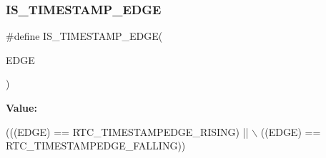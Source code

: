 \subsubsection{\texorpdfstring{I\+S\+\_\+\+T\+I\+M\+E\+S\+T\+A\+M\+P\+\_\+\+E\+D\+GE}{IS\_TIMESTAMP\_EDGE}}
{\footnotesize\ttfamily \#define I\+S\+\_\+\+T\+I\+M\+E\+S\+T\+A\+M\+P\+\_\+\+E\+D\+GE(\begin{DoxyParamCaption}\item[{}]{E\+D\+GE }\end{DoxyParamCaption})}

{\bfseries Value\+:}
\begin{DoxyCode}
(((EDGE) == RTC\_TIMESTAMPEDGE\_RISING) || \(\backslash\)
                                 ((EDGE) == RTC\_TIMESTAMPEDGE\_FALLING))
\end{DoxyCode}
